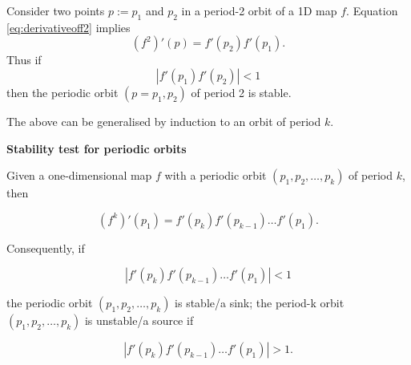 \documentclass[
  a4paper,
  oneside,
  final]{krantz}
\theoremstyle{definition}
\theoremstyle{definition}
\theoremstyle{definition}
\theoremstyle{definition}
\theoremstyle{remark}
\begin{document}
Consider two points \(p:=p_1\) and \(p_2\) in a period-2 orbit of a 1D map \(f\). Equation \eqref{eq:derivativeoff2} implies
\[(f^2)'(p) = f'(p_2)f'(p_1).\] Thus if \[|f'(p_1)f'(p_2)| <1\] then the periodic orbit \((p=p_1, p_2)\) of period 2 is stable.

The above can be generalised by induction to an orbit of period \(k\).

\begin{palegreenbox}

\begin{center}
\textbf{Stability test for periodic orbits}

\end{center}

Given a one-dimensional map \(f\) with a periodic orbit \((p_1, p_2, \ldots, p_k)\) of period \(k\), then

\[(f^{k})'(p_1) = f'(p_k)f'(p_{k-1}) \ldots f'(p_1).\]

Consequently, if

\[|f'(p_k)f'(p_{k-1}) \ldots f'(p_1)| <1\]

the periodic orbit \((p_1, p_2, \ldots, p_k)\) is stable/a sink; the period-k orbit \((p_1, p_2, \ldots, p_k)\) is unstable/a source if

\[ |f'(p_k)f'(p_{k-1}) \ldots f'(p_1)| >1.\]

\end{palegreenbox}
\end{document}
